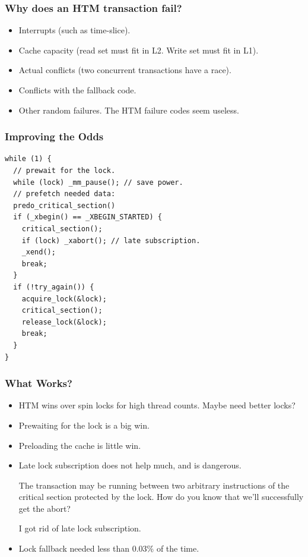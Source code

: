 \documentclass[xcolor=dvipsnames,14pt]{beamer}
\newcommand{\smmpunt}[1]{#1}
\begin{document}
\smmpunt{
\begin{frame}
\frametitle{Why does an HTM transaction fail?}
\begin{itemize}
\item Interrupts (such as time-slice).
\item Cache capacity (read set must fit in L2.  Write set must fit in L1).
\item Actual conflicts (two concurrent transactions have a race).
\item Conflicts with the fallback code.
\item Other random failures.  The HTM failure codes seem useless.
\end{itemize}

\end{frame}
}

\smmpunt{}
\begin{frame}[fragile]
\frametitle{Improving the Odds}

\begin{verbatim}
while (1) {
  // prewait for the lock.
  while (lock) _mm_pause(); // save power.
  // prefetch needed data:
  predo_critical_section()
  if (_xbegin() == _XBEGIN_STARTED) {
    critical_section();
    if (lock) _xabort(); // late subscription.
    _xend();
    break;
  }
  if (!try_again()) {
    acquire_lock(&lock);
    critical_section();
    release_lock(&lock);
    break;
  }
}
\end{verbatim}
\end{frame}
{}

\smmpunt{
\begin{frame}
\frametitle{What Works?}

\begin{itemize}
\item HTM wins over spin locks for high thread counts.  Maybe need better locks?
\item Prewaiting for the lock is a big win.
\item Preloading the cache is little win.
\item Late lock subscription does not help much, and is dangerous.  

The transaction may be running between two arbitrary instructions of
the critical section protected by the lock.  How do you know that
we'll successfully get the abort?

I got rid of late lock subscription.
\item Lock fallback needed less than 0.03\% of the time.
\end{itemize}
\end{frame}
}
\end{document}
